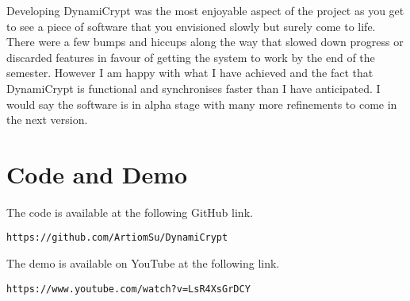 Developing DynamiCrypt was the most enjoyable aspect of the project as you get to see a piece of software that you envisioned slowly but surely come to life. There were a few bumps and hiccups along the way that slowed down progress or discarded features in favour of getting the system to work by the end of the semester. However I am happy with what I have achieved and the fact that DynamiCrypt is functional and synchronises faster than I have anticipated. I would say the software is in alpha stage with many more refinements to come in the next version. 

\section{Code and Demo}
The code is available at the following GitHub link.
\begin{lstlisting}
https://github.com/ArtiomSu/DynamiCrypt
\end{lstlisting}
The demo is available on YouTube at the following link.
\begin{lstlisting}
https://www.youtube.com/watch?v=LsR4XsGrDCY
\end{lstlisting}




















































